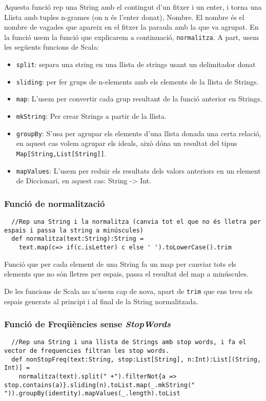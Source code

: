 \documentclass[11pt,a4paper,twoside]{report}
\begin{document}
Aquesta funció rep una String amb el contingut d'un fitxer i un enter, i torna una Llista amb tuples n-grames (on n és l'enter donat), Nombre. El nombre és el nombre de vagades que apareix en el fitxer la paraula amb la que va agrupat.
En la funció usem la funció que explicarem a continuació, \texttt{normalitza}. A part, usem les següents funcions de Scala:
\begin{itemize}
  \item \texttt{split}: separa una string en una llista de strings usant un delimitador donat
  \item \texttt{sliding}: per fer grups de n-elements amb els elements de la llista de Strings.
  \item \texttt{map}: L'usem per convertir cada grup resultant de la funció anterior en Strings.
  \item \texttt{mkString}: Per crear Strings a partir de la llista.
  \item \texttt{groupBy}: S'usa per agrupar els elements d'una llista donada una certa relació, en aquest cas volem agrupar els ideals,
    això dóna un resultat del tipus \texttt{Map[String,List[String]]}.
  \item \texttt{mapValues}: L'usem per reduir els resultats dels valors anteriors en un element de Diccionari, en aquest cas: String -> Int.
\end{itemize}

\subsubsection{Funció de normalització}
\begin{lstlisting}
  //Rep una String i la normalitza (canvia tot el que no és lletra per espais i passa la string a minúscules)
  def normalitza(text:String):String =
    text.map(c=> if(c.isLetter) c else ' ').toLowerCase().trim
\end{lstlisting}

Funció que per cada element de una String fa un map per canviar tots els elements que no són lletres per espais, passa el resultat del map a minúscules.

De les funcions de Scala no n'usem cap de nova, apart de \texttt{trim} que ens treu els espais generats al principi i al final de la String normalitzada.

\subsubsection{Funció de Freqüències sense \textit{StopWords}}
\begin{lstlisting}
  //Rep una String i una llista de Strings amb stop words, i fa el vector de frequencies filtran les stop words.
  def nonStopFreq(text:String, stop:List[String], n:Int):List[(String, Int)] =
    normalitza(text).split(" +").filterNot{a => stop.contains(a)}.sliding(n).toList.map(_.mkString(" ")).groupBy(identity).mapValues(_.length).toList
\end{lstlisting}
\end{document}
